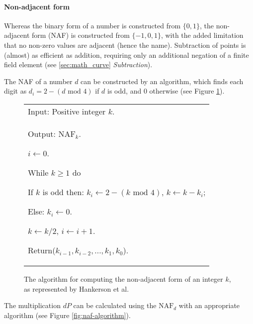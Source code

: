\paragraph{Non-adjacent form}

Whereas the binary form of a number is constructed from \(\{0,1\}\), the non-adjacent form (NAF) is constructed from \(\{-1,0,1\}\), with
the added limitation that no non-zero values are adjacent (hence the name). Subtraction of points is (almost) as efficient as addition,
requiring only an additional negation of a finite field element (see \ref{sec:math_curve} \emph{Subtraction}).

The NAF of a number \(d\) can be constructed by an algorithm, which finds each digit as \(d_i = 2 - (d \text{ mod } 4)\) if \(d\) is odd, and
\(0\) otherwise (see Figure \ref{fig:compute-naf-algorithm}).

\begin{figure}[htb!]
	\centering
	\begin{tabular}{|p{\textwidth}|}
		\hline
		Input: Positive integer \(k\). \\
		Output: \(\text{NAF}_k\).

		\begin{enumerate*}
			\item \(i \gets 0\).
            \item While \(k \geq 1\) do
			\begin{enumerate*}
                \item If \(k\) is odd then: \(k_i \gets 2 - (k \text{ mod } 4)\), \(k \gets k - k_i\);
                \item Else: \(k_i \gets 0\).
                \item \(k \gets k/2\), \(i \gets i + 1\).
			\end{enumerate*}
			\item Return(\(k_{i-1}, k_{i-2}, ..., k_1, k_0\)).
		\end{enumerate*}
		\\
		\hline
	\end{tabular}
	\caption{The algorithm for computing the non-adjacent form of an integer \(k\), as represented by Hankerson et al.\cite{hankerson2010}}
	\label{fig:compute-naf-algorithm}
\end{figure}

The multiplication \(dP\) can be calculated using the \(\text{NAF}_d\) with an appropriate algorithm (see Figure \ref{fig:naf-algorithm}).

